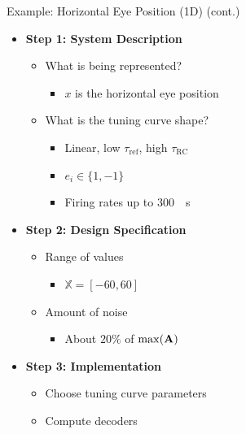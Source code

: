 \documentclass[handout,aspectratio=169]{beamer}
\begin{document}
\begin{frame}{Example: Horizontal Eye Position (1D) (cont.)}
	\begin{multicols}{2}
		\begin{itemize}
			\setlength{\itemsep}{0.5cm}
			\item \textbf{Step 1: System Description}
			\begin{itemize}
				\setlength{\itemsep}{0.5cm}
				\item What is being represented?
				\begin{itemize}
					\setlength{\itemsep}{0.25cm}
					\item $x$ is the horizontal eye position
				\end{itemize}
				\item What is the tuning curve shape?
				\begin{itemize}
					\setlength{\itemsep}{0.25cm}
					\item Linear, low $\tau_\mathrm{ref}$, high $\tau_\mathrm{RC}$
					\item $e_i \in \{1, -1\}$
					\item Firing rates up to \SI{300}{\per\second}
				\end{itemize}
			\end{itemize}
			\columnbreak
			\item \textbf{Step 2: Design Specification}
			\begin{itemize}
				\setlength{\itemsep}{0.25cm}
				\item Range of values
				\begin{itemize}
					\setlength{\itemsep}{0.25cm}
					\item $\mathbb{X} = [-60, 60]$
				\end{itemize}
				\item Amount of noise
				\begin{itemize}
					\setlength{\itemsep}{0.25cm}
					\item About $20\%$ of $\max({\mathbf{A}})$
				\end{itemize}
			\end{itemize}
			\item \textbf{Step 3: Implementation}
			\begin{itemize}
				\setlength{\itemsep}{0.25cm}
				\item Choose tuning curve parameters
				\item Compute decoders
			\end{itemize}
		\end{itemize}
	\end{multicols}
\end{frame}
\end{document}
